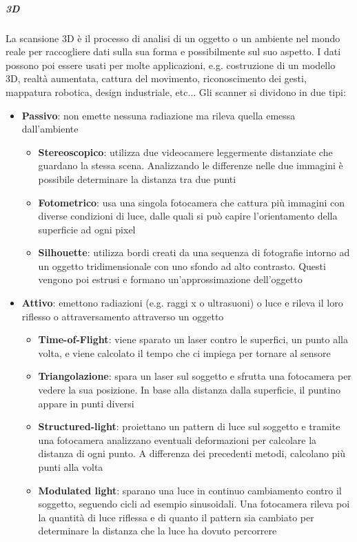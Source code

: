 \subparagraph{3D} La scansione 3D è il processo di analisi di un oggetto o un ambiente nel mondo reale per raccogliere dati sulla sua forma e possibilmente sul suo aspetto. I dati possono poi essere usati per molte applicazioni, e.g. costruzione di un modello 3D, realtà aumentata, cattura del movimento, riconoscimento dei gesti, mappatura robotica, design industriale, etc$\ldots$ Gli scanner si dividono in due tipi:
\begin{itemize}
	\item \textbf{Passivo}: non emette nessuna radiazione ma rileva quella emessa dall'ambiente
	\begin{itemize}
		\item \textbf{Stereoscopico}: utilizza due videocamere leggermente distanziate che guardano la stessa scena. Analizzando le differenze nelle due immagini è possibile determinare la distanza tra due punti
		\item \textbf{Fotometrico}: usa una singola fotocamera che cattura più immagini con diverse condizioni di luce, dalle quali si può capire l'orientamento della superficie ad ogni pixel
		\item \textbf{Silhouette}: utilizza bordi creati da una sequenza di fotografie intorno ad un oggetto tridimensionale con uno sfondo ad alto contrasto. Questi vengono poi estrusi e formano un'approssimazione dell'oggetto
	\end{itemize}
	\item \textbf{Attivo}: emettono radiazioni (e.g. raggi x o ultrasuoni) o luce e rileva il loro riflesso o attraversamento attraverso un oggetto
	\begin{itemize}
		\item \textbf{Time-of-Flight}: viene sparato un laser contro le superfici, un punto alla volta, e viene calcolato il tempo che ci impiega per tornare al sensore
		\item \textbf{Triangolazione}: spara un laser sul soggetto e sfrutta una fotocamera per vedere la sua posizione. In base alla distanza dalla superficie, il puntino appare in punti diversi
		\item \textbf{Structured-light}: proiettano un pattern di luce sul soggetto e tramite una fotocamera analizzano eventuali deformazioni per calcolare la distanza di ogni punto. A differenza dei precedenti metodi, calcolano più punti alla volta
		\item \textbf{Modulated light}: sparano una luce in continuo cambiamento contro il soggetto, seguendo cicli ad esempio sinusoidali. Una fotocamera rileva poi la quantità di luce riflessa e di quanto il pattern sia cambiato per determinare la distanza che la luce ha dovuto percorrere
	\end{itemize}
\end{itemize}

